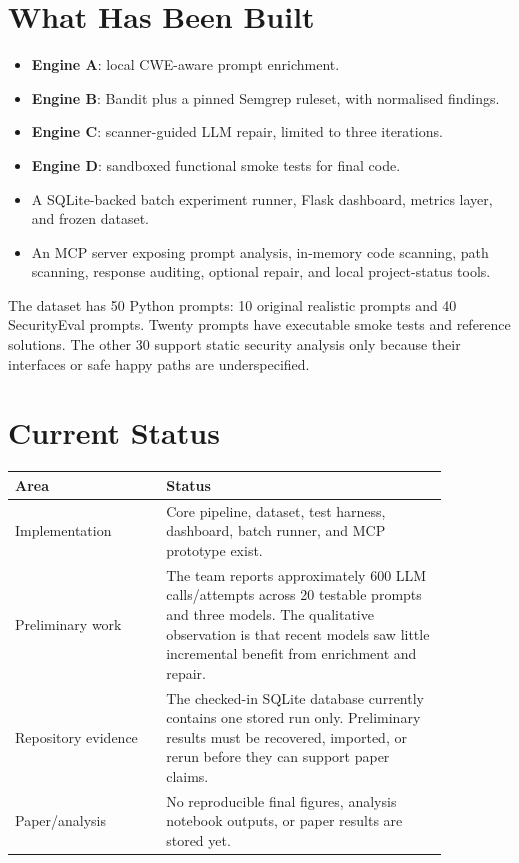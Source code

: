 \documentclass[11pt,a4paper]{article}
\begin{document}
\section{What Has Been Built}
\begin{itemize}
\item \textbf{Engine A}: local CWE-aware prompt enrichment.
\item \textbf{Engine B}: Bandit plus a pinned Semgrep ruleset, with normalised findings.
\item \textbf{Engine C}: scanner-guided LLM repair, limited to three iterations.
\item \textbf{Engine D}: sandboxed functional smoke tests for final code.
\item A SQLite-backed batch experiment runner, Flask dashboard, metrics layer, and frozen dataset.
\item An MCP server exposing prompt analysis, in-memory code scanning, path scanning, response auditing, optional repair, and local project-status tools.
\end{itemize}
The dataset has 50 Python prompts: 10 original realistic prompts and 40 SecurityEval prompts. Twenty prompts have executable smoke tests and reference solutions. The other 30 support static security analysis only because their interfaces or safe happy paths are underspecified.

\section{Current Status}
\begin{center}
\begin{tabular}{p{0.30\linewidth}p{0.56\linewidth}}
\toprule
Area & Status \\
\midrule
Implementation & Core pipeline, dataset, test harness, dashboard, batch runner, and MCP prototype exist. \\
Preliminary work & The team reports approximately 600 LLM calls/attempts across 20 testable prompts and three models. The qualitative observation is that recent models saw little incremental benefit from enrichment and repair. \\
Repository evidence & The checked-in SQLite database currently contains one stored run only. Preliminary results must be recovered, imported, or rerun before they can support paper claims. \\
Paper/analysis & No reproducible final figures, analysis notebook outputs, or paper results are stored yet. \\
\bottomrule
\end{tabular}
\end{center}
\end{document}
